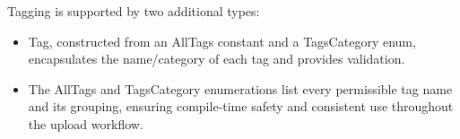 Tagging is supported by two additional types:
\begin{itemize}
    \item Tag, constructed from an AllTags constant and a TagsCategory enum, encapsulates the name/category of each tag and provides validation.
    \item The AllTags and TagsCategory enumerations list every permissible tag name and its grouping, ensuring compile‐time safety and consistent use throughout the upload workflow.
\end{itemize}
